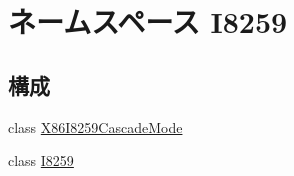\hypertarget{namespaceI8259}{
\section{ネームスペース I8259}
\label{namespaceI8259}
}
\subsection*{構成}
\begin{DoxyCompactItemize}
\item 
class \hyperlink{classI8259_1_1X86I8259CascadeMode}{X86I8259CascadeMode}
\item 
class \hyperlink{classI8259_1_1I8259}{I8259}
\end{DoxyCompactItemize}
